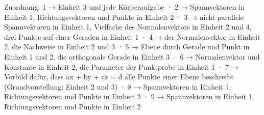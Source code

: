 
Zuordnung: 1 → Einheit 3 und jede Körperaufgabe · 2 → Spannvektoren in Einheit 1, Richtungsvektoren und Punkte in Einheit 2 · 3 → nicht parallele Spannvektoren in Einheit 1, Vielfache des Normalenvektors in Einheit 2 und 4, drei Punkte auf einer Geraden in Einheit 1 · 4 → der Normalenvektor in Einheit 2, die Nachweise in Einheit 2 und 3 · 5 → Ebene durch Gerade und Punkt in Einheit 1 und 2, die orthogonale Gerade in Einheit 3 · 6 → Normalenvektor und Konstante in Einheit 2, die Parameter der Punktprobe in Einheit 1 · 7 → Vorbild dafür, dass ax + by + cz = d alle Punkte einer Ebene beschreibt (Grundvorstellung; Einheit 2 und 3) · 8 → Spannvektoren in Einheit 1, Richtungsvektoren und Punkte in Einheit 2 · 9 → Spannvektoren in Einheit 1, Richtungsvektoren und Punkte in Einheit 2

